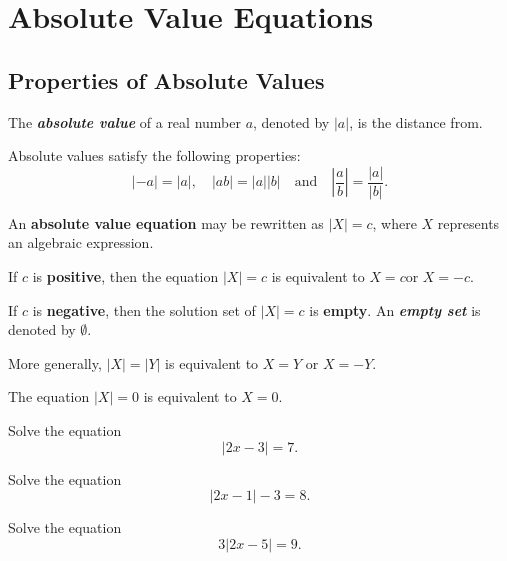 
\hypertarget{absolute-value-equations}{%
\section{Absolute Value Equations}\label{absolute-value-equations}}

\hypertarget{properties-of-absolute-values}{%
\subsection{Properties of Absolute
Values}\label{properties-of-absolute-values}}

The \textbf{\emph{absolute value}} of a real number \(a\), denoted by
\(|a|\), is the distance from.

Absolute values satisfy the following properties: \[
|-a|=|a|, \quad |ab|=|a||b| \quad \text{and} \quad \left|\frac{a}{b}\right|=\frac{|a|}{|b|}.
\]

An \textbf{absolute value equation} may be rewritten as \(|X| =c\), where \(X\) represents an algebraic expression.

If \(c\) is \textbf{positive}, then the equation \(|X| =c\) is equivalent
to \(X=c\)\quad or \quad \(X=-c\).

If \(c\) is \textbf{negative}, then the solution set of \(|X| =c\) is
\textbf{empty}. An \textbf{\emph{empty set}} is denoted by
\(\emptyset\).

More generally, \(|X|=|Y|\) is equivalent to \(X=Y\) or \(X=-Y\).

The equation \(|X|=0\) is equivalent to \(X=0\).

\begin{example}

Solve the equation \[|2x-3|=7.\]

\end{example}

\vspace*{5\baselineskip}

\begin{example}

Solve the equation \[|2x-1|-3=8.\]

\end{example}
\vspace*{5\baselineskip}

\begin{example}

Solve the equation \[3|2x-5|=9.\]

\end{example}
\vspace*{5\baselineskip}


